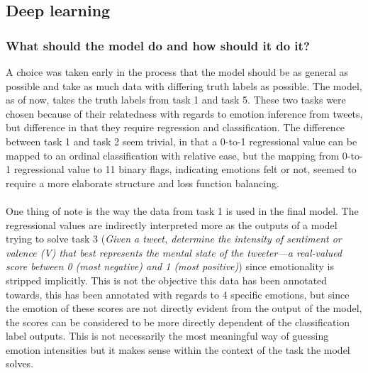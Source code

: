 \subsection{Deep learning}
\subsubsection{What should the model do and how should it do it?}
A choice was taken early in the process that the model should be as general as possible and take as much data with differing truth labels as possible. The model, as of now, takes the truth labels from task 1 and task 5. These two tasks were chosen because of their relatedness with regards to emotion inference from tweets, but difference in that they require regression and classification. The difference between task 1 and task 2 seem trivial, in that a 0-to-1 regressional value can be mapped to an ordinal classification with relative ease, but the mapping from 0-to-1 regressional value to 11 binary flags, indicating emotions felt or not, seemed to require a more elaborate structure and loss function balancing.\\
\\
One thing of note is the way the data from task 1 is used in the final model. The regressional values are indirectly interpreted more as the outputs of a model trying to solve task 3 (\textit{Given a tweet, determine the intensity of sentiment or valence (V) that best represents the mental state of the tweeter—a real-valued score between 0 (most negative) and 1 (most positive)}) since emotionality is stripped implicitly. This is not the objective this data has been annotated towards, this has been annotated with regards to 4 specific emotions, but since the emotion of these scores are not directly evident from the output of the model, the scores can be considered to be more directly dependent of the classification label outputs. This is not necessarily the most meaningful way of guessing emotion intensities but it makes sense within the context of the task the model solves.

